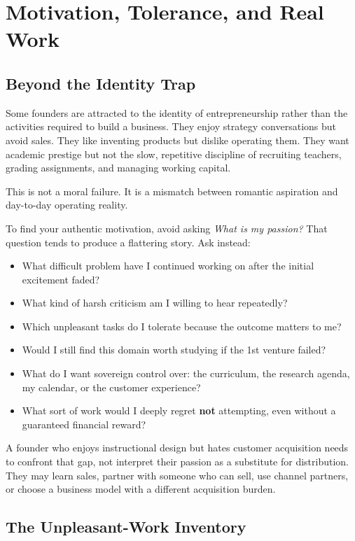 \section{Motivation, Tolerance, and Real Work}

\subsection{Beyond the Identity Trap}

Some founders are attracted to the identity of entrepreneurship rather than the activities required to build a business. They enjoy strategy conversations but avoid sales. They like inventing products but dislike operating them. They want academic prestige but not the slow, repetitive discipline of recruiting teachers, grading assignments, and managing working capital.

This is not a moral failure. It is a mismatch between romantic aspiration and day-to-day operating reality.

To find your authentic motivation, avoid asking \textit{What is my passion?} That question tends to produce a flattering story. Ask instead:

\begin{itemize}[leftmargin=11pt,itemsep=1.5pt,topsep=1.5pt,parsep=0pt]
  \item What difficult problem have I continued working on after the initial excitement faded?
  \item What kind of harsh criticism am I willing to hear repeatedly?
  \item Which unpleasant tasks do I tolerate because the outcome matters to me?
  \item Would I still find this domain worth studying if the 1st venture failed?
  \item What do I want sovereign control over: the curriculum, the research agenda, my calendar, or the customer experience?
  \item What sort of work would I deeply regret \textbf{not} attempting, even without a guaranteed financial reward?
\end{itemize}

A founder who enjoys instructional design but hates customer acquisition needs to confront that gap, not interpret their passion as a substitute for distribution. They may learn sales, partner with someone who can sell, use channel partners, or choose a business model with a different acquisition burden.

\subsection{The Unpleasant-Work Inventory}

